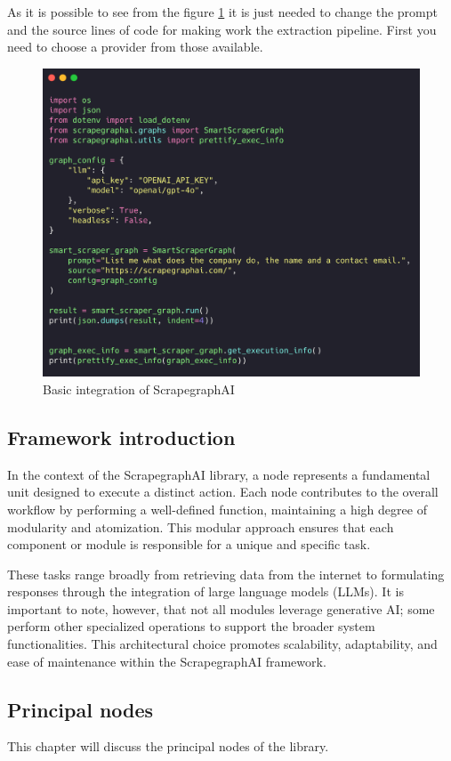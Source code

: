 As it is possible to see from the figure \ref{fig:scrapegraph-script} it is just needed to change the prompt and the source lines of code for making work the extraction pipeline. First you need to choose a provider from those available.

\begin{figure}[H]
    \centering
    \includegraphics[width=0.75\linewidth]{Assets/scrapegraph_integration.png}
    \caption{Basic integration of ScrapegraphAI }
    \label{fig:scrapegraph-script}
\end{figure}

\subsection{Framework introduction}

In the context of the ScrapegraphAI  library, a node represents a fundamental unit designed to execute a distinct action. Each node contributes to the overall workflow by performing a well-defined function, maintaining a high degree of modularity and atomization. This modular approach ensures that each component or module is responsible for a unique and specific task.

These tasks range broadly from retrieving data from the internet to formulating responses through the integration of large language models (LLMs). It is important to note, however, that not all modules leverage generative AI; some perform other specialized operations to support the broader system functionalities. This architectural choice promotes scalability, adaptability, and ease of maintenance within the ScrapegraphAI  framework.
\subsection{Principal nodes}
This chapter will discuss the principal nodes of the library. 
